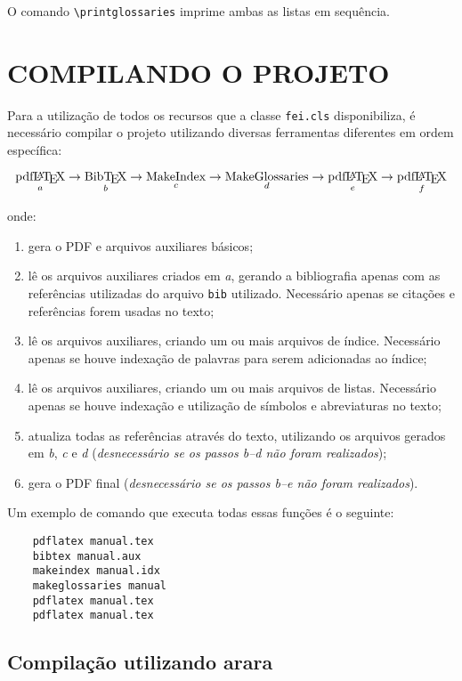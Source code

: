 \documentclass{fei}
\begin{document}
	O comando \verb+\printglossaries+ imprime ambas as listas em sequência.

	\chapter{COMPILANDO O PROJETO} \label{chap:compilando}
	
	Para a utilização de todos os recursos que a classe \verb+fei.cls+ disponibiliza, é necessário compilar o projeto utilizando diversas ferramentas diferentes em ordem específica:
	
	\[\operatorname*{\text{pdf\LaTeX}}_a \to \operatorname*{\text{Bib\TeX}}_b \to \operatorname*{\text{MakeIndex}}_c \to \operatorname*{\text{MakeGlossaries}}_d \to \operatorname*{\text{pdf\LaTeX}}_e \to \operatorname*{\text{pdf\LaTeX}}_f\]
	
	onde:
	
	\begin{enumerate}
	\item gera o PDF e arquivos auxiliares básicos;
	\item lê os arquivos auxiliares criados em \emph{a}, gerando a bibliografia apenas com as referências utilizadas do arquivo \texttt{bib} utilizado. Necessário apenas se citações e referências forem usadas no texto;
	\item lê os arquivos auxiliares, criando um ou mais arquivos de índice. Necessário apenas se houve indexação de palavras para serem adicionadas ao índice;
	\item lê os arquivos auxiliares, criando um ou mais arquivos de listas. Necessário apenas se houve indexação e utilização de símbolos e abreviaturas no texto;
	\item atualiza todas as referências através do texto, utilizando os arquivos gerados em \emph{b}, \emph{c} e \emph{d} (\emph{desnecessário se os passos b--d não foram realizados});
	\item gera o PDF final (\emph{desnecessário se os passos b--e não foram realizados}).
	\end{enumerate}
	
	Um exemplo de comando que executa todas essas funções é o seguinte:
	
	\begin{verbatim}
	pdflatex manual.tex
	bibtex manual.aux
	makeindex manual.idx
	makeglossaries manual
	pdflatex manual.tex
	pdflatex manual.tex
	\end{verbatim}
	
	\section{Compilação utilizando arara}
	
\end{document}

